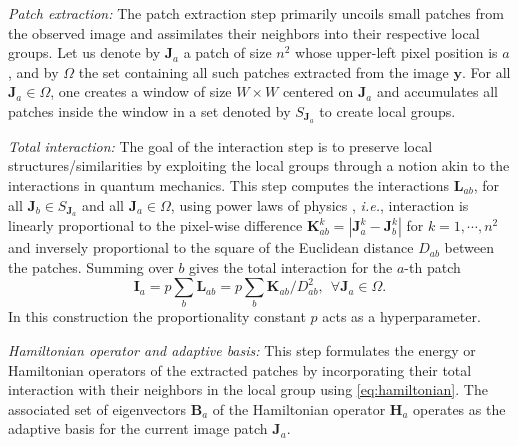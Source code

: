 \documentclass[10pt,journal,compsoc]{IEEEtran}
\def\bsy{{\boldsymbol{y}}}
\def\bsH{{\boldsymbol{H}}}
\def\bsI{{\boldsymbol{I}}}
\def\bsJ{{\boldsymbol{J}}}
\def\bsK{{\boldsymbol{K}}}
\def\bsL{{\boldsymbol{L}}}
\def\bsB{{\boldsymbol{B}}}
\begin{document}
\textit{Patch extraction:}
The patch extraction step primarily uncoils small patches from the observed image and assimilates their neighbors into their respective local groups. Let us denote by $\bsJ_a$ a patch of size $n^2$ whose upper-left pixel position is $a$, and by $\Omega$ the set containing all such patches extracted from the image $\bsy$. For all $\bsJ_a \in \Omega$, one creates a window of size $W \times W$ centered on $\bsJ_a$ and accumulates all patches inside the window in a set denoted by $S_{\bsJ_a}$ to create local groups.





\textit{Total interaction:}
The goal of the interaction step is to preserve local structures/similarities by exploiting the local groups through a notion akin to the interactions in quantum mechanics. This step computes the interactions $\bsL_{ab}$, for all $\bsJ_b \in S_{\bsJ_a}$ and all $\bsJ_a \in \Omega$, using power laws of physics \cite{dutta2022novel}, \textit{i.e.}, interaction is linearly proportional to the pixel-wise difference $\bsK_{ab}^k = | \bsJ_a^k - \bsJ_b^k |$ for $k = 1,\cdots, n^2$ and inversely proportional to the square of the Euclidean distance $D_{ab}$ between the patches. Summing over $b$ gives the total interaction for the $a$-th patch
\begin{equation}
\bsI_a = p \sum_b \bsL_{ab} = p \sum_b \bsK_{ab} / D_{ab}^2, ~~\forall \bsJ_a \in \Omega.
\label{eq:powerlaw}
\end{equation}
In this construction the proportionality constant $p$ acts as a hyperparameter.




\textit{Hamiltonian operator and adaptive basis:}
This step formulates the energy or Hamiltonian operators of the extracted patches by incorporating their total interaction with their neighbors in the local group using \eqref{eq:hamiltonian}.
The associated set of eigenvectors $\bsB_a$ of the Hamiltonian operator $\bsH_a$ operates as the adaptive basis for the current image patch $\bsJ_a$.



\end{document}
